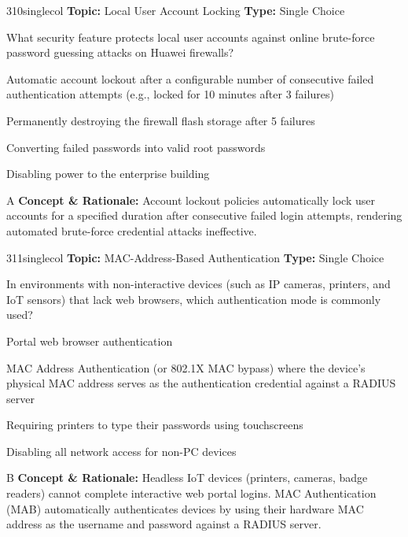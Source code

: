 \begin{qcard}{310}{singlecol}
\textcolor{darkslate!75}{\small\textbf{Topic:} Local User Account Locking \hfill \textbf{Type:} Single Choice}\vspace{0.4em}\par
What security feature protects local user accounts against online brute-force password guessing attacks on Huawei firewalls?
\begin{qoptions}
\item Automatic account lockout after a configurable number of consecutive failed authentication attempts (e.g., locked for 10 minutes after 3 failures)
\item Permanently destroying the firewall flash storage after 5 failures
\item Converting failed passwords into valid root passwords
\item Disabling power to the enterprise building
\end{qoptions}
\end{qcard}
\nopagebreak
\begin{explainbox}{A}
\textbf{Concept \& Rationale:} Account lockout policies automatically lock user accounts for a specified duration after consecutive failed login attempts, rendering automated brute-force credential attacks ineffective.
\end{explainbox}

\begin{qcard}{311}{singlecol}
\textcolor{darkslate!75}{\small\textbf{Topic:} MAC-Address-Based Authentication \hfill \textbf{Type:} Single Choice}\vspace{0.4em}\par
In environments with non-interactive devices (such as IP cameras, printers, and IoT sensors) that lack web browsers, which authentication mode is commonly used?
\begin{qoptions}
\item Portal web browser authentication
\item MAC Address Authentication (or 802.1X MAC bypass) where the device's physical MAC address serves as the authentication credential against a RADIUS server
\item Requiring printers to type their passwords using touchscreens
\item Disabling all network access for non-PC devices
\end{qoptions}
\end{qcard}
\nopagebreak
\begin{explainbox}{B}
\textbf{Concept \& Rationale:} Headless IoT devices (printers, cameras, badge readers) cannot complete interactive web portal logins. MAC Authentication (MAB) automatically authenticates devices by using their hardware MAC address as the username and password against a RADIUS server.
\end{explainbox}

